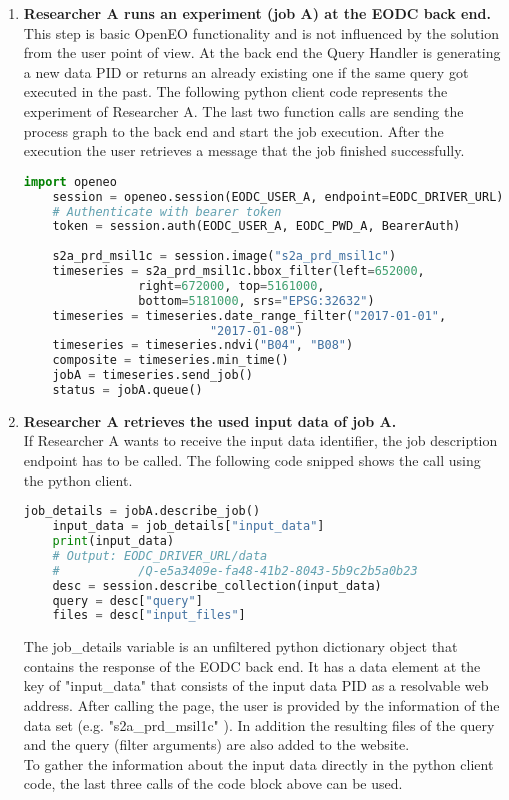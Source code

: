 \documentclass[draft,final]{vutinfth} %
\begin{document}
\begin{enumerate}
	\item \textbf{Researcher A runs an experiment (job A) at the EODC back end.} \\
	This step is basic OpenEO functionality and is not influenced by the solution from the user point of view. At the back end the Query Handler is generating a new data PID or returns an already existing one if the same query got executed in the past. The following python client code represents the experiment of Researcher A. The last two function calls are sending the process graph to the back end and start the job execution. After the execution the user retrieves a message that the job finished successfully.  
	\begin{lstlisting}[frame=single, language=Python]
	import openeo
	session = openeo.session(EODC_USER_A, endpoint=EODC_DRIVER_URL)
	# Authenticate with bearer token
	token = session.auth(EODC_USER_A, EODC_PWD_A, BearerAuth)
	
	s2a_prd_msil1c = session.image("s2a_prd_msil1c")
	timeseries = s2a_prd_msil1c.bbox_filter(left=652000, 
				right=672000, top=5161000,
				bottom=5181000, srs="EPSG:32632")
	timeseries = timeseries.date_range_filter("2017-01-01", 
						  "2017-01-08")
	timeseries = timeseries.ndvi("B04", "B08")
	composite = timeseries.min_time()
	jobA = timeseries.send_job()
	status = jobA.queue()
	\end{lstlisting}
	
	\item \textbf{Researcher A retrieves the used input data of job A.} \\
	If Researcher A wants to receive the input data identifier, the job description endpoint has to be called. The following code snipped shows the call using the python client.
	
	\begin{lstlisting}[frame=single, language=Python]
	job_details = jobA.describe_job()
	input_data = job_details["input_data"]
	print(input_data)
	# Output: EODC_DRIVER_URL/data
	#			/Q-e5a3409e-fa48-41b2-8043-5b9c2b5a0b23
	desc = session.describe_collection(input_data)
	query = desc["query"]
	files = desc["input_files"]
	\end{lstlisting}
	
	The job\_details variable is an unfiltered python dictionary object that contains the response of the EODC back end. It has a data element at the key of "input\_data" that consists of the input data PID as a resolvable web address. After calling the page, the user is provided by the information of the data set (e.g. "s2a\_prd\_msil1c" ). In addition the resulting files of the query and the query (filter arguments) are also added to the website. \\
	To gather the information about the input data directly in the python client code, the last three calls of the code block above can be used.    
	

\end{enumerate}
\end{document}
